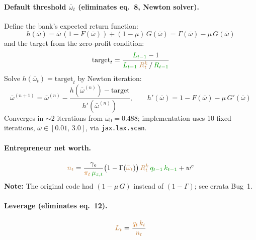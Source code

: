 \documentclass[11pt]{article}
\begin{document}
\paragraph{Default threshold $\bar\omega_t$ (eliminates eq.~8, Newton solver).}
Define the bank's expected return function:
\begin{equation*}
  h(\bar\omega) = \bar\omega\,(1-F(\bar\omega)) + (1-\mu)\,G(\bar\omega)
  = \Gamma(\bar\omega) - \mu\,G(\bar\omega)
\end{equation*}
and the target from the zero-profit condition:
\begin{equation*}
  \text{target}_t = \frac{\textcolor{green!60!black}{L_{t-1}} - 1}
    {\textcolor{green!60!black}{L_{t-1}}\;\textcolor{brown}{R_t^k}\,/\,\textcolor{green!60!black}{R_{t-1}}}
\end{equation*}
Solve $h(\bar\omega_t) = \text{target}_t$ by Newton iteration:
\begin{equation*}
  \boxed{\bar\omega^{(n+1)} = \bar\omega^{(n)}
    - \frac{h(\bar\omega^{(n)}) - \text{target}}{h'(\bar\omega^{(n)})},
  \qquad
  h'(\bar\omega) = 1-F(\bar\omega) - \mu\,G'(\bar\omega)}
\end{equation*}
Converges in ${\sim}2$ iterations from $\bar\omega_0 = 0.488$;
implementation uses 10 fixed iterations, $\bar\omega \in [0.01,\,3.0]$, via
\texttt{jax.lax.scan}.

\paragraph{Entrepreneur net worth.}
\begin{equation*}
  \textcolor{brown}{n_t} = \frac{\gamma_e}{\textcolor{orange!80!black}{\pi_t}\,\textcolor{green!60!black}{\mu_{z,t}}}
    \bigl(1 - \Gamma(\textcolor{brown}{\bar\omega_t})\bigr)\,
    \textcolor{brown}{R_t^k}\,\textcolor{green!60!black}{q_{t-1}}\,\textcolor{green!60!black}{k_{t-1}}
    + w^e
\end{equation*}
\textbf{Note:} The original code had $(1 - \mu\,G)$ instead of $(1-\Gamma)$;
see errata Bug~1.

\paragraph{Leverage (eliminates eq.~12).}
\begin{equation*}
  \textcolor{brown}{L_t} = \frac{\textcolor{orange!80!black}{q_t}\,\textcolor{brown}{k_t}}
    {\textcolor{brown}{n_t}}
\end{equation*}
\end{document}
